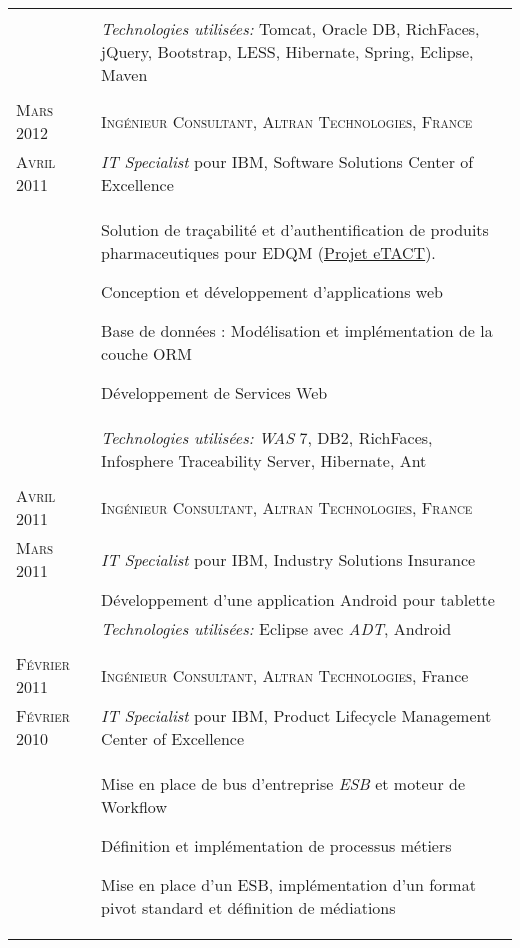 \begin{longtable}{R{2.5cm}|p{14.8cm}}
{\begin{compactitem}
    \end{compactitem}
  }\\&
 	\footnotesize{\emph{Technologies utilisées:} Tomcat, Oracle DB, RichFaces, jQuery, Bootstrap, LESS, Hibernate, Spring, Eclipse, Maven }\\
  \\
 	\textsc{Mars 2012} & \textsc{Ingénieur Consultant, Altran Technologies, France}\\
 	\textsc{Avril 2011}& \emph{IT Specialist} pour IBM, Software Solutions Center of Excellence\\&
 	\small{
 		Solution de traçabilité et d'authentification de produits pharmaceutiques pour EDQM (\href{https://www.edqm.eu/fr/eTACT-1466.html}{Projet eTACT}).
 		\begin{compactitem}
			\item Conception et développement d'applications web
      \item Base de données : Modélisation et implémentation de la couche ORM
			\item Développement de Services Web
		\end{compactitem}
	}\\&
 	\footnotesize{\emph{Technologies utilisées:} \emph{WAS} 7, DB2, RichFaces, Infosphere Traceability Server, Hibernate, Ant}\\
  \\
 	\textsc{Avril 2011} & \textsc{Ingénieur Consultant, Altran Technologies, France}\\
 	\textsc{Mars 2011}& \emph{IT Specialist} pour IBM, Industry Solutions Insurance\\&
 	\small{Développement d'une application Android pour tablette}\\&
 	\footnotesize{\emph{Technologies utilisées:} Eclipse avec \emph{ADT}, Android}\\
  \\
 	\textsc{Février 2011} & \textsc{Ingénieur Consultant, Altran Technologies}, France\\
 	\textsc{Février 2010}& \emph{IT Specialist} pour IBM, Product Lifecycle Management Center of Excellence\\&
 	\small{
    Mise en place de bus d'entreprise \emph{ESB} et moteur de Workflow
 		\begin{compactitem}
 			\item Définition et implémentation de processus métiers
 			\item Mise en place d'un ESB, implémentation d'un format pivot standard et définition de médiations

\end{compactitem}}
\end{longtable}
